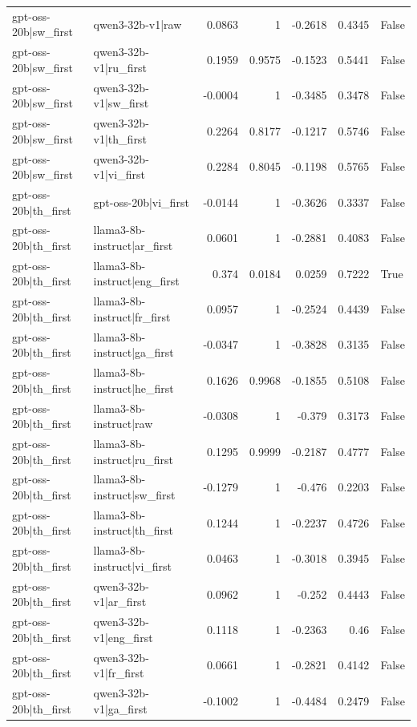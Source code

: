 \begin{table}
\begin{tabular}{l l r r r r l}
gpt-oss-20b|sw_first & qwen3-32b-v1|raw & 0.0863 & 1 & -0.2618 & 0.4345 & False \\
gpt-oss-20b|sw_first & qwen3-32b-v1|ru_first & 0.1959 & 0.9575 & -0.1523 & 0.5441 & False \\
gpt-oss-20b|sw_first & qwen3-32b-v1|sw_first & -0.0004 & 1 & -0.3485 & 0.3478 & False \\
gpt-oss-20b|sw_first & qwen3-32b-v1|th_first & 0.2264 & 0.8177 & -0.1217 & 0.5746 & False \\
gpt-oss-20b|sw_first & qwen3-32b-v1|vi_first & 0.2284 & 0.8045 & -0.1198 & 0.5765 & False \\
gpt-oss-20b|th_first & gpt-oss-20b|vi_first & -0.0144 & 1 & -0.3626 & 0.3337 & False \\
gpt-oss-20b|th_first & llama3-8b-instruct|ar_first & 0.0601 & 1 & -0.2881 & 0.4083 & False \\
gpt-oss-20b|th_first & llama3-8b-instruct|eng_first & 0.374 & 0.0184 & 0.0259 & 0.7222 & True \\
gpt-oss-20b|th_first & llama3-8b-instruct|fr_first & 0.0957 & 1 & -0.2524 & 0.4439 & False \\
gpt-oss-20b|th_first & llama3-8b-instruct|ga_first & -0.0347 & 1 & -0.3828 & 0.3135 & False \\
gpt-oss-20b|th_first & llama3-8b-instruct|he_first & 0.1626 & 0.9968 & -0.1855 & 0.5108 & False \\
gpt-oss-20b|th_first & llama3-8b-instruct|raw & -0.0308 & 1 & -0.379 & 0.3173 & False \\
gpt-oss-20b|th_first & llama3-8b-instruct|ru_first & 0.1295 & 0.9999 & -0.2187 & 0.4777 & False \\
gpt-oss-20b|th_first & llama3-8b-instruct|sw_first & -0.1279 & 1 & -0.476 & 0.2203 & False \\
gpt-oss-20b|th_first & llama3-8b-instruct|th_first & 0.1244 & 1 & -0.2237 & 0.4726 & False \\
gpt-oss-20b|th_first & llama3-8b-instruct|vi_first & 0.0463 & 1 & -0.3018 & 0.3945 & False \\
gpt-oss-20b|th_first & qwen3-32b-v1|ar_first & 0.0962 & 1 & -0.252 & 0.4443 & False \\
gpt-oss-20b|th_first & qwen3-32b-v1|eng_first & 0.1118 & 1 & -0.2363 & 0.46 & False \\
gpt-oss-20b|th_first & qwen3-32b-v1|fr_first & 0.0661 & 1 & -0.2821 & 0.4142 & False \\
gpt-oss-20b|th_first & qwen3-32b-v1|ga_first & -0.1002 & 1 & -0.4484 & 0.2479 & False \\

\end{tabular}
\end{table}
